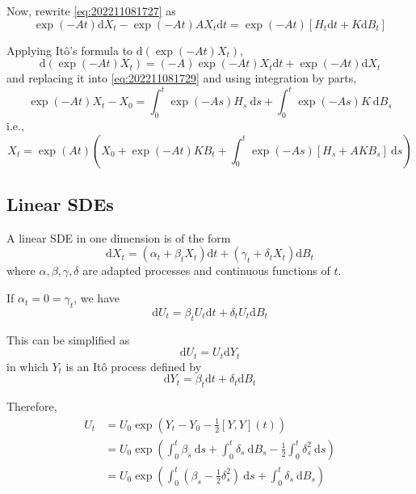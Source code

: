\begin{example}
    Now, rewrite \eqref{eq:202211081727} as
    \begin{equation}\label{eq:202211081729}
        \exp(-At) \mathrm{d} X_t - \exp(-At) AX_t\mathrm{d}t = \exp(-At)[H_t\mathrm{d}t + K\mathrm{d}B_t]
    \end{equation}

    Applying Itô's formula to $\mathrm{d}(\exp(-At) X_t)$, 
    \[
        \mathrm{d}(\exp(-At)X_t) = (-A)\exp(-At)X_t\mathrm{d}t + \exp(-At)\mathrm{d}X_t
    \]
    and replacing it into \eqref{eq:202211081729} and using integration by parts,
    \[
        \exp(-At)X_t - X_0 = \int_0^t \exp(-As)H_s ~\mathrm{d}s + \int_0^t \exp(-As) K ~\mathrm{d}B_s
    \]
    i.e.,
    \[
        X_t = \exp(At)\left( X_0 + \exp(-At)K B_t + \int_0^t \exp(-As)[H_s + AK B_s]~\mathrm{d}s \right)
    \]
\end{example}

\begin{example}
    
\end{example}

\subsection{Linear SDEs}

A linear SDE in one dimension is of the form
\begin{equation}
    \mathrm{d}X_t = (\alpha_t + \beta_t X_t)\mathrm{d}t + (\gamma_t + \delta_t X_t)\mathrm{d}B_t
\end{equation}
where $\alpha, \beta, \gamma, \delta$ are adapted processes and continuous functions of $t$.

\begin{example}
    If $\alpha_t = 0 = \gamma_t$, we have
    \begin{equation}
        \mathrm{d}U_t = \beta_t U_t \mathrm{d}t + \delta_t U_t \mathrm{d}B_t
    \end{equation}

    This can be simplified as 
    \begin{equation}
        \mathrm{d}U_t = U_t \mathrm{d}Y_t
    \end{equation}
    in which $Y_t$ is an Itô process defined by
    \[
        \mathrm{d}Y_t = \beta_t \mathrm{d}t + \delta_t \mathrm{d}B_t
    \]

    Therefore,
    \begin{equation*}
        \begin{aligned}
            U_t &= U_0 \exp \left( Y_t - Y_0 - \frac{1}{2}[Y, Y](t) \right) \\
                &= U_0 \exp \left( \int_0^t \beta_s~\mathrm{d}s + \int_0^t \delta_s~\mathrm{d}B_s - \frac{1}{2}\int_0^t \delta_s^2~\mathrm{d}s \right) \\
                &= U_0 \exp \left( \int_0^t \left( \beta_s - \frac{1}{2} \delta_s^2 \right)~\mathrm{d}s + \int_0^t \delta_s~\mathrm{d}B_s \right)
        \end{aligned}
    \end{equation*}
\end{example}

